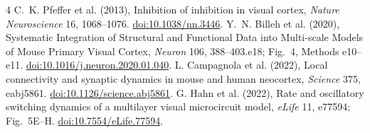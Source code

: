 \documentclass[11pt]{article}
\begin{document}
\begingroup\footnotesize
\begin{thebibliography}{4}\setlength{\itemsep}{0pt}
 C.~K. Pfeffer et al. (2013), Inhibition of inhibition in visual cortex,
\emph{Nature Neuroscience} 16, 1068--1076. \href{https://doi.org/10.1038/nn.3446}{doi:10.1038/nn.3446}.
 Y.~N. Billeh et al. (2020), Systematic Integration of Structural and
Functional Data into Multi-scale Models of Mouse Primary Visual Cortex,
\emph{Neuron} 106, 388--403.e18; Fig.~4, Methods e10--e11.
\href{https://doi.org/10.1016/j.neuron.2020.01.040}{doi:10.1016/j.neuron.2020.01.040}.
 L. Campagnola et al. (2022), Local connectivity and synaptic
dynamics in mouse and human neocortex, \emph{Science} 375, eabj5861.
\href{https://doi.org/10.1126/science.abj5861}{doi:10.1126/science.abj5861}.
 G. Hahn et al. (2022), Rate and oscillatory switching dynamics of a
multilayer visual microcircuit model, \emph{eLife} 11, e77594; Fig.~5E--H.
\href{https://doi.org/10.7554/eLife.77594}{doi:10.7554/eLife.77594}.
\end{thebibliography}\endgroup
\end{document}
